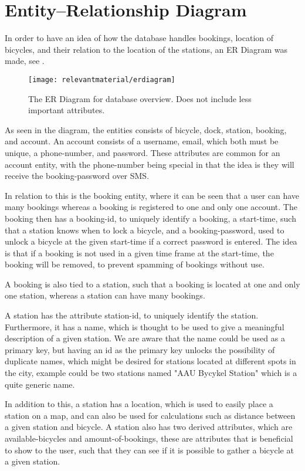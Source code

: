 \section{Entity--Relationship Diagram}
In order to have an idea of how the database handles bookings, location of bicycles, and their relation to the location of the stations, an ER Diagram was made, see .

\begin{figure}
	\centering
	\texttt{[image: relevantmaterial/erdiagram]}
	\caption{The ER Diagram for database overview. Does not include less important attributes.}\label{fig:er-dia}
\end{figure}

As seen in the diagram, the entities consists of bicycle, dock, station, booking, and account.
An account consists of a username, email, which both must be unique, a phone-number, and password.
These attributes are common for an account entity, with the phone-number being special in that the idea is they will receive the booking-password over SMS.

In relation to this is the booking entity, where it can be seen that a user can have many bookings whereas a booking is registered to one and only one account.
The booking then has a booking-id, to uniquely identify a booking, a start-time, such that a station knows when to lock a bicycle, and a booking-password, used to unlock a bicycle at the given start-time if a correct password is entered.
The idea is that if a booking is not used in a given time frame at the start-time, the booking will be removed, to prevent spamming of bookings without use.

A booking is also tied to a station, such that a booking is located at one and only one station, whereas a station can have many bookings.

A station has the attribute station-id, to uniquely identify the station.
Furthermore, it has a name, which is thought to be used to give a meaningful description of a given station.
We are aware that the name could be used as a primary key, but having an id as the primary key unlocks the possibility of duplicate names, which might be desired for stations located at different spots in the city, example could be two stations named "AAU Bycykel Station" which is a quite generic name.

In addition to this, a station has a location, which is used to easily place a station on a map, and can also be used for calculations such as distance between a given station and bicycle.
A station also has two derived attributes, which are available-bicycles and amount-of-bookings, these are attributes that is beneficial to show to the user, such that they can see if it is possible to gather a bicycle at a given station.

